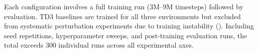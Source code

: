 Each configuration involves a full training run (3M--9M timesteps) followed by evaluation. TD3 baselines are trained for all three environments but excluded from systematic perturbation experiments due to training instability (). Including seed repetitions, hyperparameter sweeps, and post-training evaluation runs, the total exceeds 300 individual runs across all experimental axes.
